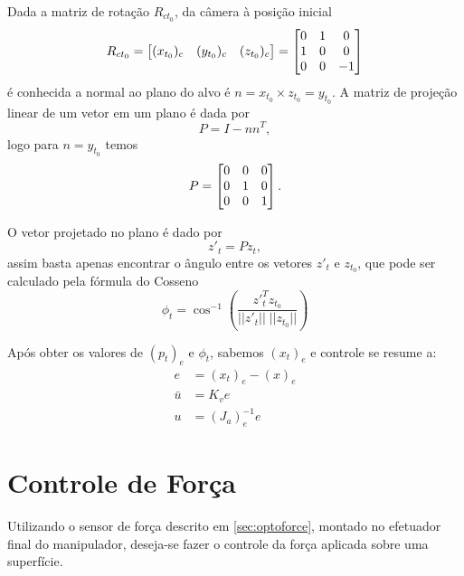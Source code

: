 Dada a matriz de rotação ${R}_{ct_0}$, da câmera à posição inicial
\begin{equation}
{R}_{ct_0} = \begin{bmatrix} ({x}_{t_0})_c & ({y}_{t_0})_c  & ({z}_{t_0})_c\end{bmatrix} = 
\begin{bmatrix}
	0 & 1 & 0 \\
	1 & 0 & 0 \\
	0 & 0 & -1
\end{bmatrix}
\end{equation}
é conhecida a normal ao plano do alvo é ${n} = {x}_{t_0} \times {z}_{t_0} =  {y}_{t_0} $. A matriz de projeção linear \citep{strang} de um vetor em um plano é dada por
\begin{equation}
{P} = {I} - {n} {n}^T,
\end{equation}
logo para ${n} = {y}_{t_0}$ temos 
\begin{equation}
{P} =  \begin{bmatrix}
	 0  &   0  &   0 \\
     0  &   1  &   0 \\
     0  &   0  &   1
\end{bmatrix}.
\end{equation}

O vetor projetado no plano é dado por
\begin{equation}
{z'}_{t} = {P} {z}_{t},
\end{equation}
assim basta apenas encontrar o ângulo entre os vetores ${z'}_{t}$ e ${z}_{t_0}$, que pode ser calculado pela fórmula do Cosseno \citep{strang} 
\begin{equation}
\phi_t = \cos^{-1} \left( \frac{{z'}^T_{t} {z}_{t_0} } {||{z'}_{t}|| \; ||{z}_{t_0}||} \right)
\end{equation}




Após obter os valores de $(p_t)_e$ e $\phi_t$, sabemos $(x_t)_e$ e controle se resume a:
\begin{align}
{e} &= ({x}_t)_e - ({x})_e \\
{\bar{u}} &= {K}_v {e}  \\
{u} &= ({J}_{a})_e^{-1} {e}
\end{align}

\section{Controle de Força} \label{sec:force}

Utilizando o sensor de força descrito em \ref{sec:optoforce}, montado no efetuador final do manipulador, deseja-se fazer o controle da força aplicada sobre uma superfície. 

